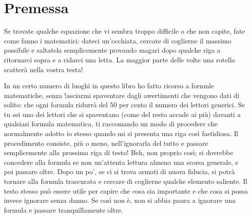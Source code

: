 \chapter*{Premessa}

Se trovate qualche equazione che vi sembra troppo difficile o che non capite, fate come fanno i matematici: dateci un'occhiata, cercate di coglierne il massimo possibile e saltatela semplicemente provando magari dopo qualche riga a ritornarci sopra e a ridarci una letta. La maggior parte delle volte una rotella scatterà nella vostra testa! 

In un certo numero di luoghi in questo libro ho fatto ricorso a fornmle matematiche, senza !asciarmi spaventare dagli awerti­menti che vengono dati di solito: che ogni formula ridurrà del 50 per cento il numero dei lettori generici. Se tu sei uno dei lettori che si spaventano (come del resto accade ai più) davanti a qualsiasi formula matematica, ti raccomando un modo di procedere che normalmente adotto io stesso quando mi si presenta una riga così fastidiosa. Il procedimento consiste, più o meno, nell'ignorarla del tutto e passare semplicemente alla prossima riga di testo! Beh, non proprio così; si dovrebbe concedere alla formula se non un'attenta lettura almeno una scorsa generale, e poi passare oltre. 
Dopo un po', se ci si trova armati di nuova fiducia, si potrà tornare alla formula trascurata e cercare di coglierne qualche elemento saliente. Il testo stesso può essere utile per capire che cosa sia importante e che cosa si possa invece ignorare senza danno. Se così non è, non si abbia paura a ignorare una formula e passare
tranquillamente oltre. \cite{book:Penrose_imperatore}

